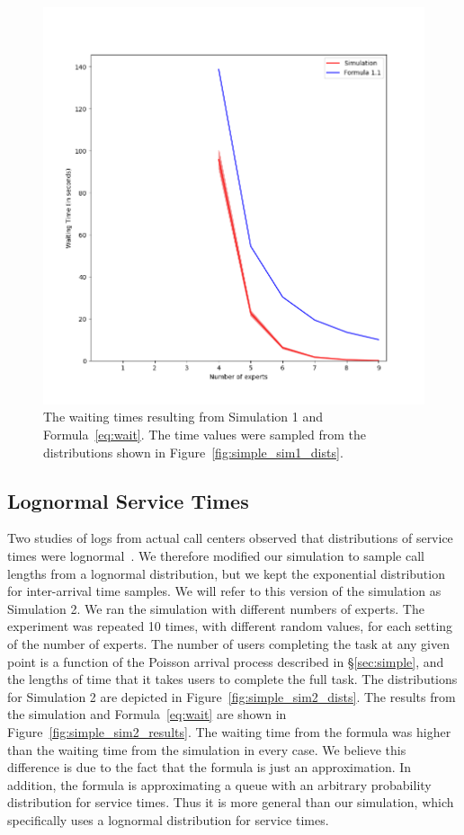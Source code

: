 \begin{figure}[H]
  \includegraphics[width=\textwidth]{figures/montecarlo/independent_calls_expon.png}
  \caption{
    The waiting times resulting from Simulation 1 and Formula~\ref{eq:wait}.
    The time values were sampled from the distributions shown in
    Figure~\ref{fig:simple_sim1_dists}.
  }\label{fig:simple_sim1_results}
\end{figure}

\subsection{Lognormal Service Times}

Two studies of logs from actual call centers observed that distributions of
service times were lognormal~\cite{queue1, queue2}.
We therefore modified our simulation to sample call lengths from a lognormal
distribution, but we kept the exponential distribution for inter-arrival time
samples.
We will refer to this version of the simulation as Simulation 2.
We ran the simulation with different numbers of experts.
The experiment was repeated 10 times, with different random values, for each
setting of the number of experts.
The number of users completing the task at any given point is a function of the
Poisson arrival process described in \S\ref{sec:simple}, and the lengths of time
that it takes users to complete the full task.
The distributions for Simulation 2 are depicted in
Figure~\ref{fig:simple_sim2_dists}.
The results from the simulation and Formula~\ref{eq:wait} are shown in
Figure~\ref{fig:simple_sim2_results}.
The waiting time from the formula was higher than the waiting time from
the simulation in every case.
We believe this difference is due to the fact that the formula is just an
approximation.
In addition, the formula is approximating a queue with an arbitrary probability
distribution for service times.
Thus it is more general than our simulation, which specifically uses a lognormal
distribution for service times.

